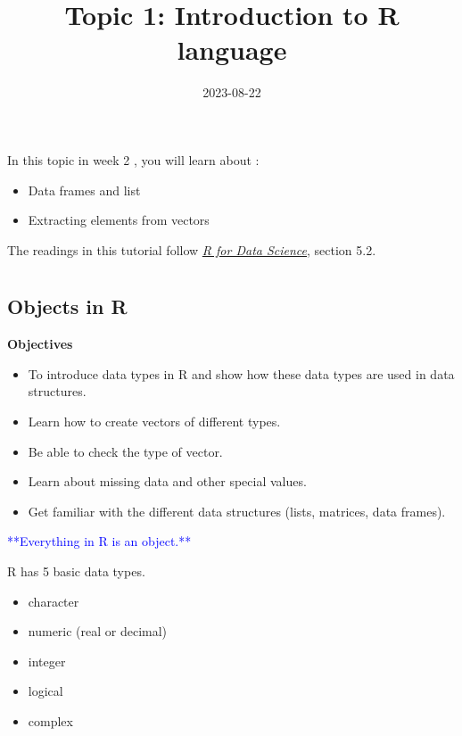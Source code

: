 \documentclass[
]{article}
\title{Topic 1: Introduction to R language}
\author{}
\date{\vspace{-2.5em}2023-08-22}
\providecommand{\tightlist}{%
  \setlength{\itemsep}{0pt}\setlength{\parskip}{0pt}}
\begin{document}
\maketitle

In this topic in week 2 , you will learn about :

\begin{itemize}
\tightlist
\item
  Data frames and list
\item
  Extracting elements from vectors
\end{itemize}

The readings in this tutorial follow
\href{http://r4ds.had.co.nz/}{\emph{R for Data Science}}, section 5.2.

\hypertarget{section}{%
\section{}\label{section}}

\hypertarget{objects-in-r}{%
\subsection{Objects in R}\label{objects-in-r}}

\textbf{Objectives}

\begin{itemize}
\tightlist
\item
  To introduce data types in R and show how these data types are used in
  data structures.
\item
  Learn how to create vectors of different types.
\item
  Be able to check the type of vector.
\item
  Learn about missing data and other special values.
\item
  Get familiar with the different data structures (lists, matrices, data
  frames).
\end{itemize}

\textcolor{blue}{**Everything in R is an object.**}

R has 5 basic data types.

\begin{itemize}
\tightlist
\item
  character
\item
  numeric (real or decimal)
\item
  integer
\item
  logical
\item
  complex
\end{itemize}
\end{document}
